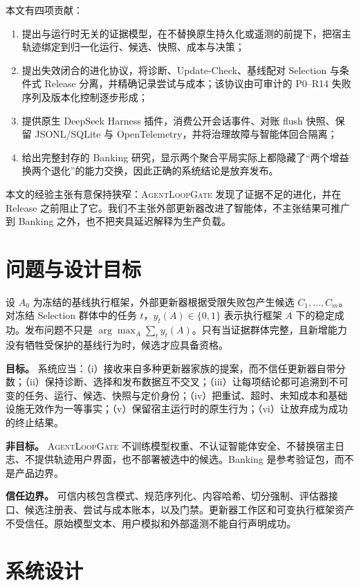 \documentclass[UTF8,10pt,twocolumn,fontset=none]{ctexart}
\newcommand{\system}{\textsc{AgentLoopGate}\xspace}
\newcommand{\leadparagraph}[1]{\par\vspace{0.6ex}\noindent\textbf{#1}\hspace{0.75em}\ignorespaces}
\begin{document}
本文有四项贡献：

\begin{enumerate}[leftmargin=*,nosep]
  \item 提出与运行时无关的证据模型，在不替换原生持久化或遥测的前提下，把宿主轨迹绑定到归一化运行、候选、快照、成本与决策；
  \item 提出失效闭合的进化协议，将诊断、Update-Check、基线配对 Selection 与条件式 Release 分离，并精确记录尝试与成本；该协议由可审计的 P0--R14 失败序列及版本化控制逐步形成；
  \item 提供原生 DeepSeek Harness 插件，消费公开会话事件、对账 flush 快照、保留 JSONL/SQLite 与 OpenTelemetry，并将治理故障与智能体回合隔离；
  \item 给出完整封存的 Banking 研究，显示两个聚合平局实际上都隐藏了“两个增益换两个退化”的能力交换，因此正确的系统结论是放弃发布。
\end{enumerate}

本文的经验主张有意保持狭窄：\system 发现了证据不足的进化，并在 Release 之前阻止了它。我们不主张外部更新器改进了智能体，不主张结果可推广到 Banking 之外，也不把夹具延迟解释为生产负载。

\section{问题与设计目标}

设 $A_0$ 为冻结的基线执行框架，外部更新器根据受限失败包产生候选 $C_1,\ldots,C_m$。对冻结 Selection 群体中的任务 $t$，$y_t(A)\in\{0,1\}$ 表示执行框架 $A$ 下的稳定成功。发布问题不只是 $\arg\max_A\sum_t y_t(A)$。只有当证据群体完整，且新增能力没有牺牲受保护的基线行为时，候选才应具备资格。

\leadparagraph{目标。}
系统应当：（i）接收来自多种更新器家族的提案，而不信任更新器自带分数；（ii）保持诊断、选择和发布数据互不交叉；（iii）让每项结论都可追溯到不可变的任务、运行、候选、快照与定价身份；（iv）把重试、超时、未知成本和基础设施无效作为一等事实；（v）保留宿主运行时的原生行为；（vi）让放弃成为成功的终止结果。

\leadparagraph{非目标。}
\system 不训练模型权重、不认证智能体安全、不替换宿主日志、不提供轨迹用户界面，也不部署被选中的候选。Banking 是参考验证包，而不是产品边界。

\leadparagraph{信任边界。}
可信内核包含模式、规范序列化、内容哈希、切分强制、评估器接口、候选注册表、尝试与成本账本，以及门禁。更新器工作区和可变执行框架资产不受信任。原始模型文本、用户模拟和外部遥测不能自行声明成功。

\section{系统设计}
\end{document}

